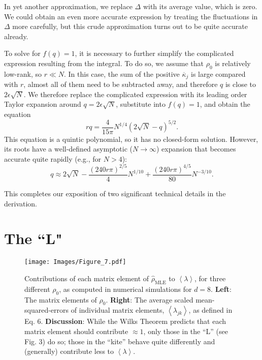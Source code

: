\documentclass[aps,pra, twocolumn]{revtex4}
\newcommand{\expect}[1]{\ensuremath{\left\langle#1\right\rangle}}
\newcommand{\rhohat}{\hat{\rho}}
\newcommand{\rhoMLE}{\rhohat_{\scriptscriptstyle\mathrm{MLE}}}
\begin{document}
In yet another approximation, we replace $\Delta$ with its average value, which is zero.  We could obtain an even more accurate expression 
 by treating the fluctuations in $\Delta$ more carefully, but this crude approximation turns out to be quite accurate already.

To solve for $f(q) = 1$, it is necessary to further simplify the complicated expression resulting from the integral.  To do so, we 
assume that $\rho_0$ is relatively low-rank, so $r \ll N$.  In this case, the sum of the positive $\overline{\kappa}_j$ is large compared 
with $r$, almost all of them need to be subtracted away, and therefore $q$ is close to $2\epsilon\sqrt{N}$.  We therefore replace 
the complicated expression with its leading order Taylor expansion around $q=2\epsilon\sqrt{N}$, substitute into $f(q)=1$, and 
obtain the equation
\begin{equation}
rq  = \frac{4}{15\pi}N^{1/4}\left(2\sqrt{N}-q\right)^{5/2}.
\end{equation}
This equation is a quintic polynomial, so it has no closed-form solution.  However, its roots have a well-defined asymptotic ($N\to
\infty$) expansion that becomes accurate quite rapidly (e.g., for $N>4$):
\begin{equation}
q \approx 2\sqrt{N}-\frac{(240r\pi)^{2/5}}{4}N^{1/10}+\frac{(240r\pi)^{4/5}}{80}N^{-3/10}.
\end{equation}

This completes our exposition of two significant technical details in the derivation.

\section{The ``L"}
\label{app:rationale}

\begin{figure}[h!]
\texttt{[image: Images/Figure\_7.pdf]}
 \caption{Contributions of each matrix element of $\rhoMLE$ to $\expect{\lambda}$, for three different $\rho_0$, as computed in numerical simulations for $d=8$.  \textbf{Left}:  The matrix elements of $\rho_0$.  \textbf{Right}:  The average scaled mean-squared-errors of individual matrix elements, $\expect{\lambda_{jk}}$, as defined in Eq. 6.  \textbf{Discussion}:  While the Wilks Theorem predicts that each matrix element should contribute $\approx1$, only those in the ``L'' (see Fig. 3) do so; those in the ``kite'' behave quite differently and (generally) contribute less to $\expect{\lambda}$.
}
\label{fig:isocontribs}
\end{figure}
\end{document}
